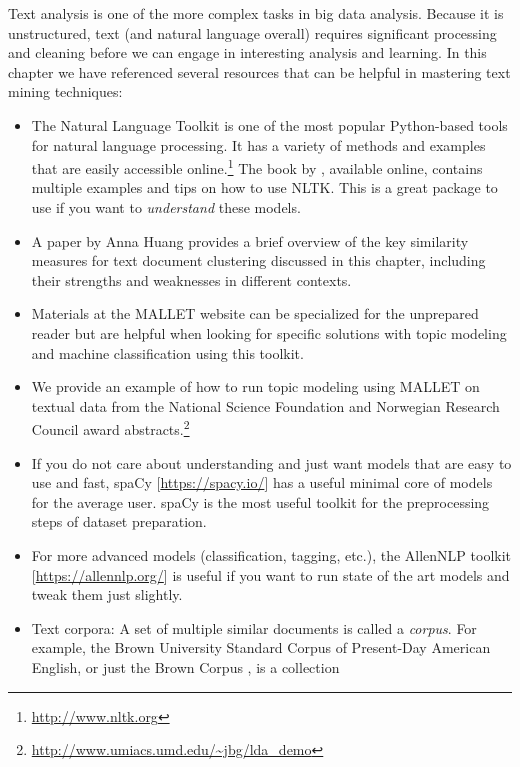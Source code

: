 \documentclass[]{krantz}
\begin{document}
Text analysis is one of the more complex tasks in big data analysis.
Because it is unstructured, text (and natural language overall) requires
significant processing and cleaning before we can engage in interesting
analysis and learning. In this chapter we have referenced several
resources that can be helpful in mastering text mining techniques:

\begin{itemize}
\item
  The Natural Language Toolkit is one of the most popular Python-based
  tools for natural language processing. It has a variety of methods and
  examples that are easily accessible online.\footnote{\url{http://www.nltk.org}}
  The book by \citet{bird-09}, available online, contains multiple
  examples and tips on how to use NLTK. This is a great package to use
  if you want to \emph{understand} these models.
\item
  A paper by Anna Huang \citeyearpar{huang-08} provides a brief overview
  of the key similarity measures for text document clustering discussed
  in this chapter, including their strengths and weaknesses in different
  contexts.
\item
  Materials at the MALLET website \citep{mallet} can be specialized for
  the unprepared reader but are helpful when looking for specific
  solutions with topic modeling and machine classification using this
  toolkit.
\item
  We provide an example of how to run topic modeling using MALLET on
  textual data from the National Science Foundation and Norwegian
  Research Council award abstracts.\footnote{\url{http://www.umiacs.umd.edu/~jbg/lda_demo}}
\item
  If you do not care about understanding and just want models that are
  easy to use and fast, spaCy {[}\url{https://spacy.io/}{]} has a useful
  minimal core of models for the average user. spaCy is the most useful
  toolkit for the preprocessing steps of dataset preparation.
\item
  For more advanced models (classification, tagging, etc.), the AllenNLP
  toolkit {[}\url{https://allennlp.org/}{]} is useful if you want to run
  state of the art models and tweak them just slightly.
\item
  Text corpora: A set of multiple similar documents is called a
  \emph{corpus}. For\\
  example, the Brown University Standard Corpus of Present-Day American
  English, or just the Brown Corpus \citep{browncorpus}, is a collection

\end{itemize}
\end{document}
